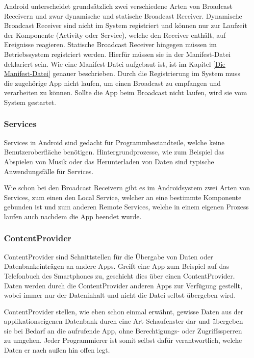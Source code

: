 Android unterscheidet grunds\"atzlich zwei verschiedene Arten von Broadcast Receivern und zwar dynamische und statische Broadcast Receiver. Dynamische Broadcast Receiver sind nicht im System registriert und k\"onnen nur zur Laufzeit der Komponente (Activity oder Service), welche den Receiver enth\"alt, auf Ereignisse reagieren. Statische Broadcast Receiver hingegen m\"ussen im Betriebssystem registriert werden. Hierf\"ur m\"ussen sie in der Manifest-Datei deklariert sein. Wie eine Manifest-Datei aufgebaut ist, ist im Kapitel \ref{Die Manifest-Datei} genauer beschrieben. Durch die Registrierung im System muss die zugeh\"orige App nicht laufen, um einen Broadcast zu empfangen und verarbeiten zu k\"onnen. Sollte die App beim Broadcast nicht laufen, wird sie vom System gestartet.

\subsubsection{Services} \label{Services aus Nutzersicht}
Services in Android sind gedacht f\"ur Programmbestandteile, welche keine Benutzeroberfl\"ache ben\"otigen. Hintergrundprozesse, wie zum Beispiel das Abspielen von Musik oder das Herunterladen von Daten sind typische Anwendungsf\"alle f\"ur Services. 

Wie schon bei den Broadcast Receivern gibt es im Androidsystem zwei Arten von Services, zum einen den Local Service, welcher an eine bestimmte Komponente gebunden ist und zum anderen  Remote Services, welche in einem eigenen Prozess laufen auch nachdem die App beendet wurde.

\subsubsection{ContentProvider} \label{ContentProvider aus Nutzersicht}
ContentProvider sind Schnittstellen f\"ur die \"Ubergabe von Daten oder Datenbankeintr\"agen an andere Apps.
Greift eine App zum Beispiel auf das Telefonbuch des Smartphones zu, geschieht dies \"uber einen ContentProvider. Daten werden durch die ContentProvider anderen Apps zur Verf\"ugung gestellt, wobei immer nur der Dateninhalt und nicht die Datei selbst \"ubergeben wird. \cite{Kuehn12}

ContentProvider stellen, wie eben schon einmal erw\"ahnt, gewisse Daten aus der applikationseigenen Datenbank durch eine Art Schaufenster dar und \"ubergeben sie bei Bedarf an die aufrufende App, ohne Berechtigungs- oder Zugriffssperren zu umgehen. Jeder Programmierer ist somit selbst daf\"ur verantwortlich, welche Daten er nach au\ss{}en hin offen legt.

